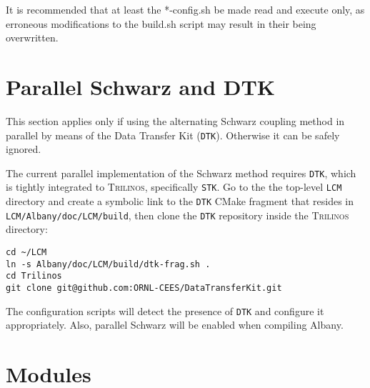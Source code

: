 \documentclass{article}
\newcommand{\trilinos}{\textsc{Trilinos}}
\begin{document}
It is recommended that at least the *-config.sh be made read and
execute only, as erroneous modifications to the build.sh script may
result in their being overwritten.

\section{Parallel Schwarz and DTK}
\label{sec:dtk}

This section applies only if using the alternating Schwarz coupling
method in parallel by means of the Data Transfer Kit (\verb+DTK+).
Otherwise it can be safely ignored.

The current parallel implementation of the Schwarz method requires
\verb+DTK+, which is tightly integrated to \trilinos{}, specifically
\verb+STK+. Go to the the top-level \verb+LCM+ directory and create a
symbolic link to the \verb+DTK+ CMake fragment that resides in
\verb+LCM/Albany/doc/LCM/build+, then clone the \verb+DTK+ repository
inside the \trilinos{} directory:
\begin{verbatim}
cd ~/LCM
ln -s Albany/doc/LCM/build/dtk-frag.sh .
cd Trilinos
git clone git@github.com:ORNL-CEES/DataTransferKit.git
\end{verbatim}
The configuration scripts will detect the presence of \verb+DTK+ and
configure it appropriately. Also, parallel Schwarz will be enabled when
compiling Albany.

\section{Modules}
\label{sec:modules}
\end{document}
